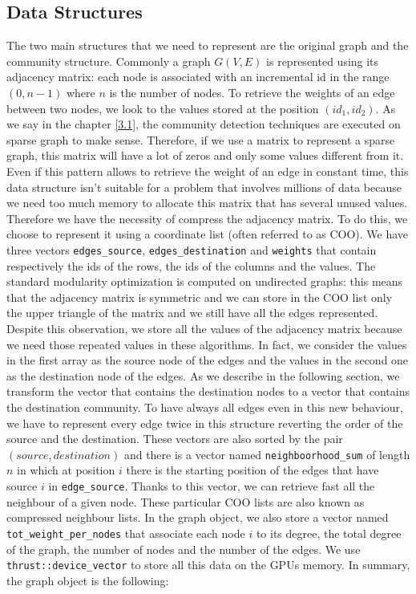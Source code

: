 \subsection{Data Structures}
The two main structures that we need to represent are the original graph and the community structure. Commonly a graph $G(V, E)$ is represented using its adjacency matrix: each node is associated with an incremental id in the range $(0, n-1)$ where $n$ is the number of nodes. To retrieve the weights of an edge between two nodes, we look to the values stored at the position $(id_1, id_2)$. As we say in the chapter \ref{3.1}, the community detection techniques are executed on sparse graph to make sense.  Therefore, if we use a matrix to represent a sparse graph, this matrix will have a lot of zeros and only some values different from it. Even if this pattern allows to retrieve the weight of an edge in constant time, this data structure isn't suitable for a problem that involves millions of data because we need too much memory to allocate this matrix that has several unused values. Therefore we have the necessity of compress the adjacency matrix. To do this, we choose to represent it using a coordinate list (often referred to as COO). We have three vectors \verb|edges_source|,  \verb|edges_destination| and  \verb|weights| that contain respectively the ids of the rows, the ids of the columns and the values. The standard modularity optimization is computed on undirected graphs: this means that the adjacency matrix is symmetric and we can store in the COO list only the upper triangle of the matrix and we still have all the edges represented. Despite this observation, we store all the values of the adjacency matrix because we need those repeated values in these algorithms. In fact, we consider the values in the first array as the source node of the edges and the values in the second one as the destination node of the edges. As we describe in the following section, we transform the vector that contains the destination nodes to a vector that contains the destination community. To have always all edges even in this new behaviour, we have to represent every edge twice in this structure reverting the order of the source and the destination. These vectors are also sorted by the pair $(source, destination)$ and there is a vector named  \verb|neighboorhood_sum| of length $n$ in which at position $i$ there is the starting position of the edges that have source $i$ in \verb|edge_source|. Thanks to this vector, we can retrieve fast all the neighbour of a given node. These particular COO lists are also known as compressed neighbour lists. In the graph object, we also store a vector named \verb| tot_weight_per_nodes| that associate each node $i$ to its degree, the total degree of the graph, the number of nodes and the number of the edges. We use \verb|thrust::device_vector| to store all this data on the GPUs memory. In summary, the graph object is the following:\\

